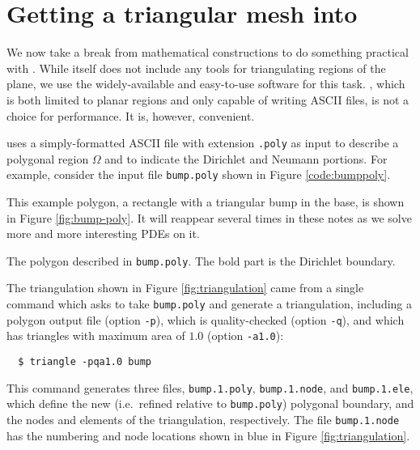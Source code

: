\section{Getting a triangular mesh into \PETSc}

We now take a break from mathematical constructions to do something practical with \PETSc.  While \PETSc itself does not include any tools for triangulating regions of the plane, we use the widely-available and easy-to-use \Triangle software \citep{Shewchuk1996} for this task.  \Triangle, which is both limited to planar regions and only capable of writing ASCII files, is not a choice for performance.  It is, however, convenient.

\Triangle uses a simply-formatted ASCII file with extension \texttt{.poly} as input to describe a polygonal region $\Omega$ and to indicate the Dirichlet and Neumann portions.  For example, consider the input file \texttt{bump.poly} shown in Figure \ref{code:bumppoly}. 


This example polygon, a rectangle with a triangular bump in the base, is shown in Figure \ref{fig:bump-poly}.  It will reappear several times in these notes as we solve more and more interesting PDEs on it.

\begin{marginfigure}

\caption{The polygon described in \texttt{bump.poly}.  The bold part is the Dirichlet boundary.}
\label{fig:bump-poly}
\end{marginfigure}

The triangulation shown in Figure \ref{fig:triangulation} came from a single command which asks \Triangle to take \texttt{bump.poly} and generate a triangulation, including a polygon output file (option \texttt{-p}), which is quality-checked \citep{Shewchuk1996} (option \texttt{-q}), and which has triangles with maximum area of $1.0$ (option \texttt{-a1.0}):
\begin{verbatim}
  $ triangle -pqa1.0 bump
\end{verbatim}
This command generates three files, \texttt{bump.1.poly}, \texttt{bump.1.node}, and  \texttt{bump.1.ele}, which define the new (i.e.~refined relative to \texttt{bump.poly}) polygonal boundary, and the nodes and elements of the triangulation, respectively.  The file \texttt{bump.1.node} has the numbering and node locations shown in blue in Figure \ref{fig:triangulation}.


